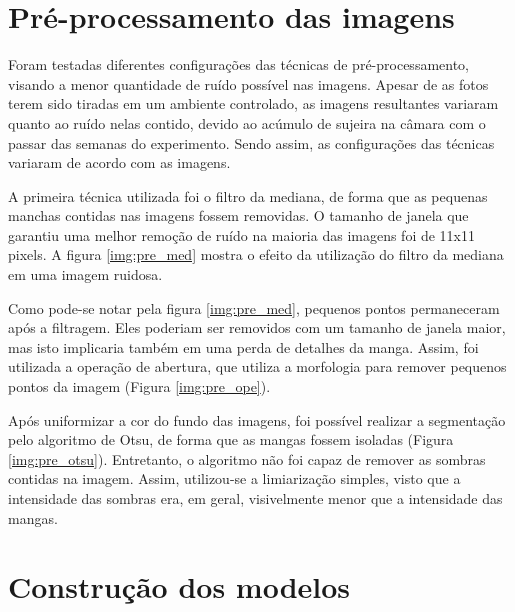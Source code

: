 \section{Pré-processamento das imagens}

Foram testadas diferentes configurações das técnicas de pré-processamento, visando a menor quantidade de ruído possível nas imagens. Apesar de as fotos terem sido tiradas em um ambiente controlado, as imagens resultantes variaram quanto ao ruído nelas contido, devido ao acúmulo de sujeira na câmara com o passar das semanas do experimento. Sendo assim, as configurações das técnicas variaram de acordo com as imagens.

A primeira técnica utilizada foi o filtro da mediana, de forma que as pequenas manchas contidas nas imagens fossem removidas. O tamanho de janela que garantiu uma melhor remoção de ruído na maioria das imagens foi de 11x11 pixels. A figura \ref{img:pre_med} mostra o efeito da utilização do filtro da mediana em uma imagem ruidosa.

Como pode-se notar pela figura \ref{img:pre_med}, pequenos pontos permaneceram após a filtragem. Eles poderiam ser removidos com um tamanho de janela maior, mas isto implicaria também em uma perda de detalhes da manga. Assim, foi utilizada a operação de abertura, que utiliza a morfologia para remover pequenos pontos da imagem (Figura \ref{img:pre_ope}).

Após uniformizar a cor do fundo das imagens, foi possível realizar a segmentação pelo algoritmo de Otsu, de forma que as mangas fossem isoladas (Figura \ref{img:pre_otsu}). Entretanto, o algoritmo não foi capaz de remover as sombras contidas na imagem. Assim, utilizou-se a limiarização simples, visto que a intensidade das sombras era, em geral, visivelmente menor que a intensidade das mangas. 

\section{Construção dos modelos}



